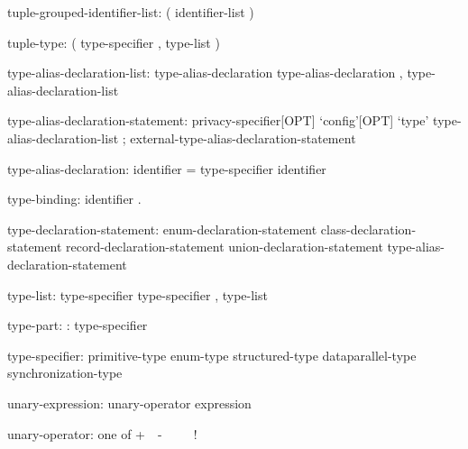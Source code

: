 \begin{syntax}
tuple-grouped-identifier-list:
  ( identifier-list )
\end{syntax}

\begin{syntax}
tuple-type:
  ( type-specifier , type-list )
\end{syntax}

\begin{syntax}
type-alias-declaration-list:
  type-alias-declaration
  type-alias-declaration , type-alias-declaration-list
\end{syntax}

\begin{syntax}
type-alias-declaration-statement:
  privacy-specifier[OPT] `config'[OPT] `type' type-alias-declaration-list ;
  external-type-alias-declaration-statement
\end{syntax}

\begin{syntax}
type-alias-declaration:
  identifier = type-specifier
  identifier
\end{syntax}

\begin{syntax}
type-binding:
  identifier .
\end{syntax}

\begin{syntax}
type-declaration-statement:
  enum-declaration-statement
  class-declaration-statement
  record-declaration-statement
  union-declaration-statement
  type-alias-declaration-statement
\end{syntax}

\begin{syntax}
type-list:
  type-specifier
  type-specifier , type-list
\end{syntax}

\begin{syntax}
type-part:
  : type-specifier
\end{syntax}

\begin{syntax}
type-specifier:
  primitive-type
  enum-type
  structured-type
  dataparallel-type
  synchronization-type
\end{syntax}

\begin{syntax}
unary-expression:
  unary-operator expression
\end{syntax}

\begin{syntax}
unary-operator: one of
  + $ $ $ $ - $ $ $ $ ~ $ $ $ $ !
\end{syntax}

